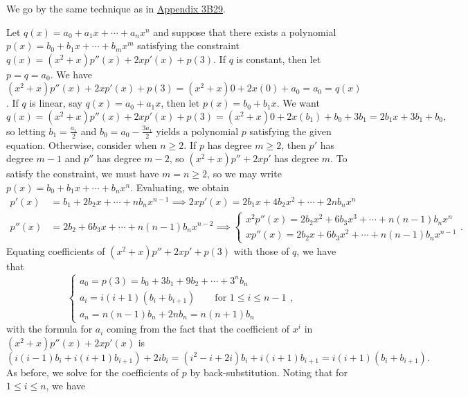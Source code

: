 \begin{coole}
    We go by the same technique as in \hyperref[apex:3b29]{Appendix 3B29}.

    Let $q(x) = a_0 + a_1x + \cdots + a_nx^n$ and suppose that there exists a polynomial $p(x) = b_0 + b_1x + \cdots + b_mx^m$ satisfying the constraint $q(x) = (x^2 + x)p''(x) + 2xp'(x) + p(3)$. 
    If $q$ is constant, then let $p = q = a_0$. We have $(x^2 + x)p''(x) + 2xp'(x) + p(3) = (x^2 + x)0 + 2x(0) + a_0 = a_0 = q(x)$.
    If $q$ is linear, say $q(x) = a_0 + a_1x$, then let $p(x) = b_0 + b_1x$. We want $$q(x) = (x^2 + x)p''(x) + 2xp'(x) + p(3) = (x^2 + x)0 + 2x(b_1) + b_0 + 3b_1 = 2b_1x + 3b_1 + b_0,$$ so letting $b_1 = \frac{a_1}{2}$ and $b_0 = a_0 - \frac{3a_1}{2}$ yields a polynomial $p$ satisfying the given equation.
    Otherwise, consider when $n \geq 2$.
    If $p$ has degree $m \geq 2$, then $p'$ has degree $m-1$ and $p''$ has degree $m-2$, so $(x^2 + x)p'' + 2xp'$ has degree $m$.
    To satisfy the constraint, we must have $m =n \geq 2$, so we may write $p(x) = b_0 + b_1x + \cdots + b_nx^n$.
    Evaluating, we obtain
    \begin{align*}
        p'(x) &= b_1 + 2b_2x + \cdots + nb_nx^{n-1} \implies 2xp'(x) = 2b_1x + 4b_2x^2 + \cdots + 2nb_nx^n\\
        p''(x) &= 2b_2 + 6b_3x + \cdots + n(n-1)b_nx^{n-2} \implies
        \begin{cases}
            x^2p''(x) = 2b_2x^2 + 6b_3x^3 + \cdots + n(n-1)b_nx^n \\
            xp''(x) = 2b_2x + 6b_3x^2 + \cdots + n(n-1)b_nx^{n-1}
        \end{cases}.
    \end{align*}
    Equating coefficients of $(x^2 + x)p'' + 2xp' + p(3)$ with those of $q$, we have that 
    \[
        \begin{cases}
            a_0 = p(3) = b_0 + 3b_1 + 9b_2 + \cdots + 3^nb_n \\
            a_i = i(i+1)(b_i + b_{i+1}) \qquad\text{for } 1 \leq i \leq n-1 \\
            a_n = n(n-1)b_n + 2nb_n = n(n+1)b_n
        \end{cases},
    \]
    with the formula for $a_i$ coming from the fact that the coefficient of $x^i$ in $(x^2 + x)p''(x) + 2xp'(x)$ is
    \[
    	(i(i-1)b_i + i(i+1)b_{i+1}) + 2ib_i = (i^2-i+2i)b_i + i(i+1)b_{i+1} = i(i+1)(b_i + b_{i+1}).
    \]
    As before, we solve for the coefficients of $p$ by back-substitution.
    Noting that for $1 \leq i \leq n$, we have
    \[
\]
\end{coole}
